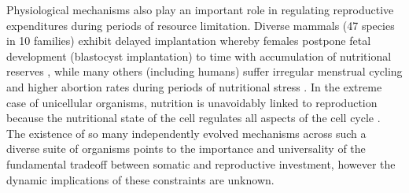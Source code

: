 \documentclass{pnastwo}
\begin{document}
\begin{article}
Physiological mechanisms also play an important role in regulating reproductive expenditures during periods of resource limitation.
Diverse mammals (47 species in 10 families) exhibit delayed implantation whereby females postpone fetal development (blastocyst implantation) to time with accumulation of nutritional reserves \cite{Mead:1989dt,Sandell:1990kw}, while many others (including humans) suffer irregular menstrual cycling and higher abortion rates during periods of nutritional stress \cite{Bulik:1999eo,Trites:2003cc}.
In the extreme case of unicellular organisms, nutrition is unavoidably linked to reproduction because the nutritional state of the cell regulates all aspects of the cell cycle \cite{Glazier:2009hq}.
The existence of so many independently evolved mechanisms across such a diverse suite of organisms points to the importance and universality of the fundamental tradeoff between somatic and reproductive investment, however the dynamic implications of these constraints are unknown.


\end{article}
\end{document}
